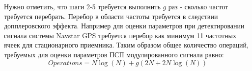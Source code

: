 Нужно отметить, что шаги 2-5 требуется выполнить ${g}$ раз - сколько частот требуется перебрать.
Перебор в области частоты требуется в следствии допплеровского эффекта. Например для оценки 
параметров при детектировании сигнала системы Navstar GPS требуется перебор как минимум
11 частотных ячеек для стационарного приемника.
Таким образом общее количество операций, требуемых для оценки параметров ПСП модулированного
сигнала равно:
\begin{equation}
	Operations = N \log (N) + g(2N + 2N \log (N)) 
\end{equation}

%
%
%
%

\newpage
